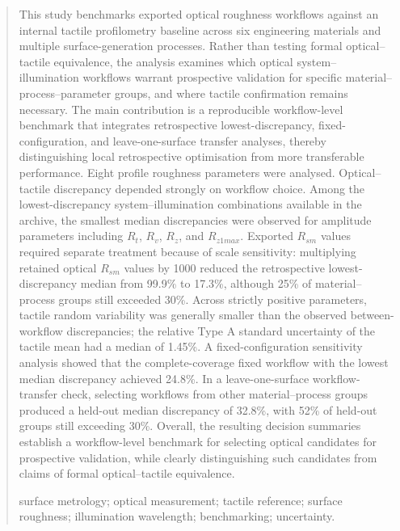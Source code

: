 \documentclass{article}
\begin{document}
\begin{abstract}
This study benchmarks exported optical roughness workflows against an internal tactile profilometry baseline across six engineering materials and multiple surface-generation processes. Rather than testing formal optical–tactile equivalence, the analysis examines which optical system–illumination workflows warrant prospective validation for specific material–process–parameter groups, and where tactile confirmation remains necessary. The main contribution is a reproducible workflow-level benchmark that integrates retrospective lowest-discrepancy, fixed-configuration, and leave-one-surface transfer analyses, thereby distinguishing local retrospective optimisation from more transferable performance.
Eight profile roughness parameters were analysed. Optical–tactile discrepancy depended strongly on workflow choice. Among the lowest-discrepancy system–illumination combinations available in the archive, the smallest median discrepancies were observed for amplitude parameters including $R_t$, $R_v$, $R_z$, and $R_{z1max}$. Exported $R_{sm}$ values required separate treatment because of scale sensitivity: multiplying retained optical $R_{sm}$ values by 1000 reduced the retrospective lowest-discrepancy median from 99.9\% to 17.3\%, although 25\% of material–process groups still exceeded 30\%.
Across strictly positive parameters, tactile random variability was generally smaller than the observed between-workflow discrepancies; the relative Type A standard uncertainty of the tactile mean had a median of 1.45\%. A fixed-configuration sensitivity analysis showed that the complete-coverage fixed workflow with the lowest median discrepancy achieved 24.8\%. In a leave-one-surface workflow-transfer check, selecting workflows from other material–process groups produced a held-out median discrepancy of 32.8\%, with 52\% of held-out groups still exceeding 30\%.
Overall, the resulting decision summaries establish a workflow-level benchmark for selecting optical candidates for prospective validation, while clearly distinguishing such candidates from claims of formal optical–tactile equivalence.

 surface metrology; optical measurement; tactile reference; surface roughness; illumination wavelength; benchmarking; uncertainty.
\end{abstract}
\end{document}
